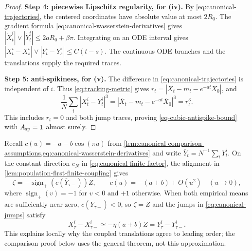 \begin{proof}
\par\noindent\textbf{Step 4: piecewise Lipschitz regularity, for (iv).}
By \eqref{eq:canonical-trajectories}, the centered coordinates have
absolute value at most $2R_0$.
The gradient formula \eqref{eq:canonical-wasserstein-derivatives} gives
$|\dot X_t^i|\vee|\dot Y_t^i|\le2aR_0+\beta\pi$.
Integrating on an ODE interval gives
$|X_t^i-X_s^i|\vee|Y_t^i-Y_s^i|\le C(t-s)$.
The continuous ODE branches and the translations supply the required traces.

\par\noindent\textbf{Step 5: anti-spikiness, for (v).}
The difference in \eqref{eq:canonical-trajectories} is independent of $i$.
Thus \eqref{eq:tracking-metric} gives
$r_t=|\overline X_t-m_t-e^{-at}\overline X_0|$, and
\[
 \frac1N\sum_i|X_t^i-Y_t^i|^3
 =|\overline X_t-m_t-e^{-at}\overline X_0|^3=r_t^3.
\]
This includes $r_t=0$ and both jump traces, proving
\eqref{eq-cubic-antispike-bound} with $A_{\rm sp}=1$ almost surely.
\end{proof}

\begin{remark}
\label{rem:canonical-jump-alignment}
Recall $c(u)=-a-b\cos(\pi u)$ from
\cref{lem:canonical-comparison-assumptions,eq:canonical-wasserstein-derivatives}
and write $\overline Y_t=N^{-1}\sum_iY_t^i$.
On the constant direction $e_N$ in
\eqref{eq:canonical-finite-factor}, the alignment in
\cref{lem:population-first-finite-coupling} gives
\[
 \zeta=-\operatorname{sign}_+(c(\overline Y_{\tau-}))Z,
 \qquad c(u)=-(a+b)+O(u^2)\quad(u\to0),
\]
where $\operatorname{sign}_+(v)=-1$ for $v<0$ and $+1$ otherwise.
When both empirical means are sufficiently near zero,
$c(\overline Y_{\tau-})<0$, so $\zeta=Z$ and the jumps in
\eqref{eq:canonical-jumps} satisfy
\[
 X_\tau^i-X_{\tau-}^i\simeq-\eta(a+b)Z=Y_\tau^i-Y_{\tau-}^i.
\]
This explains locally why the coupled translations agree to leading order;
the comparison proof below uses the general theorem, not this approximation.
\end{remark}

